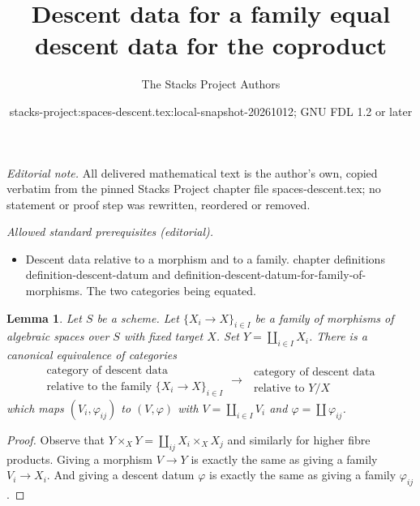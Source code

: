 \documentclass[10pt,a4paper]{amsart}
\title{Descent data for a family equal descent data for the coproduct}
\author{The Stacks Project Authors}
\date{stacks-project:spaces-descent.tex:local-snapshot-20261012; GNU FDL 1.2 or later}
\theoremstyle{plain}
\newtheorem{lemma}[subsection]{Lemma}
\theoremstyle{definition}
\theoremstyle{remark}
\numberwithin{equation}{subsection}
\begin{document}
\maketitle
\noindent\textit{Editorial note.} All delivered mathematical text is the author's own, copied verbatim from the pinned Stacks Project chapter file spaces-descent.tex; no statement or proof step was rewritten, reordered or removed.\par\medskip
\noindent\textit{Allowed standard prerequisites (editorial).}\begin{itemize}
\item Descent data relative to a morphism and to a family. chapter definitions definition-descent-datum and definition-descent-datum-for-family-of-morphisms. The two categories being equated.
\end{itemize}\medskip
\begin{lemma}
\label{lemma-family-is-one}
Let $S$ be a scheme.
Let $\{X_i \to X\}_{i \in I}$ be a family of morphisms
of algebraic spaces over $S$ with fixed target $X$.
Set $Y = \coprod_{i \in I} X_i$.
There is a canonical equivalence of categories
$$
\begin{matrix}
\text{category of descent data } \\
\text{relative to the family } \{X_i \to X\}_{i \in I}
\end{matrix}
\longrightarrow
\begin{matrix}
\text{ category of descent data} \\
\text{ relative to } Y/X
\end{matrix}
$$
which maps $(V_i, \varphi_{ij})$ to $(V, \varphi)$ with
$V = \coprod_{i\in I} V_i$ and $\varphi = \coprod \varphi_{ij}$.
\end{lemma}

\begin{proof}
Observe that $Y \times_X Y = \coprod_{ij} X_i \times_X X_j$
and similarly for higher fibre products.
Giving a morphism $V \to Y$ is exactly the same as
giving a family $V_i \to X_i$. And giving a descent datum
$\varphi$ is exactly the same as giving a family $\varphi_{ij}$.
\end{proof}
\end{document}
